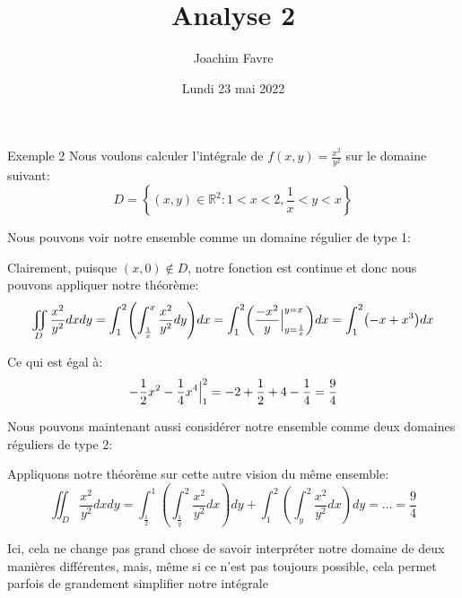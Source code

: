 \documentclass[a4paper]{article}
\title{Analyse 2}
\author{Joachim Favre}
\date{Lundi 23 mai 2022}
\begin{document}
\maketitle


\begin{parag}{Exemple 2}
    Nous voulons calculer l'intégrale de $f\left(x, y\right) = \frac{x^2}{y^2}$ sur le domaine suivant: 
    \[D = \left\{\left(x, y\right) \in \mathbb{R}^2 : 1 < x < 2, \frac{1}{x} < y < x\right\}\]
    
    Nous pouvons voir notre ensemble comme un domaine régulier de type 1:

    Clairement, puisque $\left(x, 0\right) \not\in D$, notre fonction est continue et donc nous pouvons appliquer notre théorème: 
    \[\iint_D \frac{x^2}{y^2} dxdy = \int_{1}^{2} \left(\int_{\frac{1}{x}}^{x}  \frac{x^2}{y^2} dy\right)dx = \int_{1}^{2} \left(\frac{-x^2}{y} \eval_{y=\frac{1}{x}}^{y =x}\right)dx = \int_{1}^{2} \left(-x + x^3\right)dx \]

    Ce qui est égal à: 
    \[-\frac{1}{2} x^2 - \frac{1}{4} x^4 \Big|_{1}^{2} = -2 + \frac{1}{2} + 4 - \frac{1}{4} = \frac{9}{4}\]
     
    Nous pouvons maintenant aussi considérer notre ensemble comme deux domaines réguliers de type 2:

    Appliquons notre théorème sur cette autre vision du même ensemble: 
    \[\iint_D \frac{x^2}{y^2} dxdy = \int_{\frac{1}{2}}^{1} \left(\int_{\frac{1}{y}}^{2} \frac{x^2}{y^2}dx\right)dy + \int_{1}^{2} \left(\int_{y}^{2} \frac{x^2}{y^2}dx\right)dy = \ldots = \frac{9}{4}\]
    
    Ici, cela ne change pas grand chose de savoir interpréter notre domaine de deux manières différentes, mais, même si ce n'est pas toujours possible, cela permet parfois de grandement simplifier notre intégrale
\end{parag}
\end{document}
